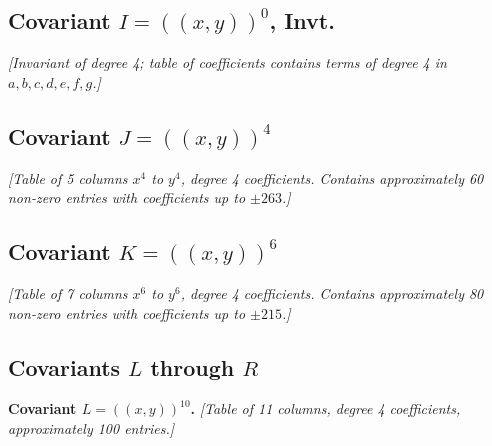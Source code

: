 \documentclass[11pt,a4paper]{book}
\begin{document}
\subsection*{Covariant $I = (\!\!(x,y)\!\!)^{0}$, Invt.}

\textit{[Invariant of degree 4; table of coefficients contains terms of degree 4 in $a,b,c,d,e,f,g$.]}

\subsection*{Covariant $J = (\!\!(x,y)\!\!)^{4}$}

\textit{[Table of 5 columns $x^{4}$ to $y^{4}$, degree 4 coefficients. Contains approximately 60 non-zero entries with coefficients up to $\pm263$.]}

\subsection*{Covariant $K = (\!\!(x,y)\!\!)^{6}$}

\textit{[Table of 7 columns $x^{6}$ to $y^{6}$, degree 4 coefficients. Contains approximately 80 non-zero entries with coefficients up to $\pm215$.]}

\newpage

\subsection*{Covariants $L$ through $R$}

\textbf{Covariant $L = (\!\!(x,y)\!\!)^{10}$.} \textit{[Table of 11 columns, degree 4 coefficients, approximately 100 entries.]}
\end{document}
